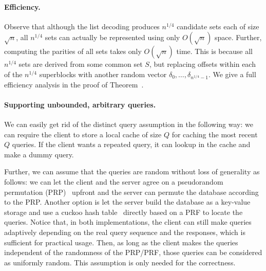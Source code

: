 \paragraph{Efficiency.}
Observe that although the list decoding
produces $n^{1/4}$ candidate sets
each of size $\sqrt{n}$, all $n^{1/4}$ 
sets can actually be represented using 
only $O(\sqrt{n})$ 
space. Further, computing the parities 
of all sets 
takes only $O(\sqrt{n})$ time.
This is because all $n^{1/4}$ sets are derived
from some common set $S$, but replacing 
offsets within each of the $n^{1/4}$ superblocks
with another random vector $\delta_0, \ldots, \delta_{n^{1/4}-1}$.
We give a full efficiency analysis
in the proof of Theorem~.


\paragraph{Supporting unbounded, arbitrary queries.}
We can easily get rid of the distinct query
assumption in the following way: we can require the client to store a local cache of size $Q$ for caching the
most recent $Q$ queries. If the client wants a repeated query, it can lookup
in the cache and make a dummy query. 

Further, we can assume that the queries are random without loss of generality as follows: we can let the client and the server agree on a pseudorandom permutation (PRP)~\cite{prp1,prp2} upfront and the server can permute the database according to the PRP. Another option is let the server
build the database as a key-value storage and use a cuckoo hash
table~\cite{cuckoo1,cuckoo2} directly based on a PRF to locate the queries.
Notice that, in both implementations, the client can still make queries
adaptively depending on the real query sequence and the responses, which is
sufficient for practical usage. Then, as long as the client makes the
queries independent of the randomness of the PRP/PRF, those queries can be
considered as uniformly random. This assumption is only needed for the
correctness.

